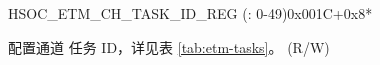 \begin{register}{H}{SOC\_ETM\_CH\_TASK\_ID\_REG (: 0-49)}{0x001C+0x8*}\label{regdesc:SOCETMCH0TASKIDREG}
%
%
\regnewline%
\begin{regdesc}\begin{reglist}
\label{fielddesc:SOCETMCH0TASKID}\item [SOC\_ETM\_CH\regindex{n}\_TASK\_ID (\regindex{n}: 0-49)] 配置通道 任务 ID，详见表 \ref{tab:etm-tasks}。 (R/W)
\end{reglist}\end{regdesc}
\end{register}


